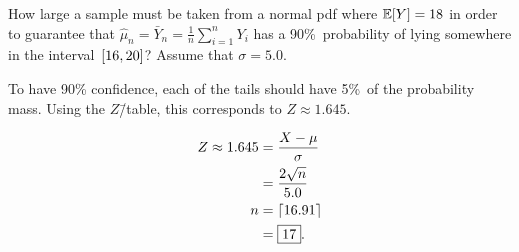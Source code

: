 \begin{problem}
   How large a sample must be taken from a normal pdf where ${\mathbb{E}\lbrack Y\rbrack = 18}$ in order to guarantee that ${\hat{\mu}_n = \bar{Y}_n = \frac{1}{n} \sum_{i=1}^{n} Y_i}$ has a 90\%~probability of lying somewhere in the interval~${\lbrack16,20\rbrack}$?  Assume that ${\sigma = 5.0}$.
\end{problem}

To have 90\% confidence, each of the tails should have 5\%~of the probability mass.  Using the $Z$\=/table, this corresponds to ${Z \approx 1.645}$.

\begin{align}
  Z \approx 1.645 &= \frac{X - \mu}{\sigma} \\
                  &= \frac{2\sqrt{n}}{5.0} \\
                n &= \lceil16.91\rceil \\
                  &= \boxed{17} \text{.}
\end{align}


